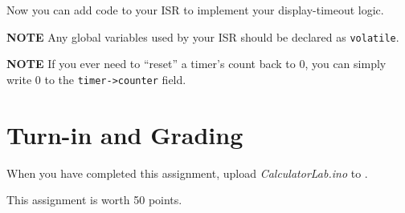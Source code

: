 Now you can add code to your ISR to implement your display-timeout logic.

\textbf{NOTE} Any global variables used by your ISR should be declared as \lstinline{volatile}.

\textbf{NOTE} If you ever need to ``reset'' a timer's count back to 0, you can
simply write 0 to the \lstinline{timer->counter} field.




\section{Turn-in and Grading}

When you have completed this assignment, upload \textit{CalculatorLab.ino} to
\filesubmission.

This assignment is worth 50 points. \\

